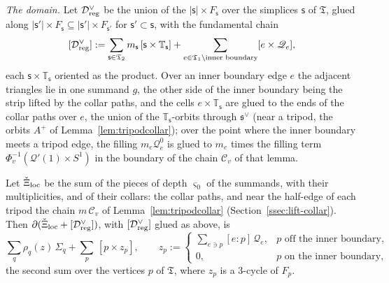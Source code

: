 \emph{The domain.} Let $\mathcal D^\vee_{\rm reg}$ be the union of the $|\mathsf s|\times F_{\mathsf s}$ over the simplices $\mathsf s$ of $\mathfrak T$,
glued along $|\mathsf s'|\times F_{\mathsf s}\subseteq|\mathsf s'|\times F_{\mathsf s'}$ for $\mathsf s'\subset \mathsf s$, with the fundamental chain
\[
[\mathcal D^\vee_{\rm reg}]:=\sum_{\mathsf s\in\mathfrak T_2}m_{\mathsf s}\,[\mathsf s\times\mathbb T_{\mathsf s}]+\sum_{e\in\mathfrak T_1\setminus\text{inner boundary}}[e\times \mathscr Q_e],
\]
each $\mathsf s\times\mathbb T_{\mathsf s}$ oriented as the product. Over an inner boundary edge $e$ the adjacent triangles lie in one summand
$g$, the other side of the inner boundary being the strip lifted by the collar paths, and the cells $e\times\mathbb T_{\mathsf s}$ are glued
to the ends of the collar paths over $e$, the union of the $\mathbb T_{\mathsf s}$-orbits through $\mathfrak s^\vee$ (near a
tripod, the orbits $A^+$ of Lemma~\ref{lem:tripodcollar}); over the point where the inner boundary meets a tripod edge, the
filling $m_e\mathscr Q_e^0$ is glued to $m_e$ times the filling term $\Phi_v^{-1}(\mathcal Q'(1)\times S^1)$ in the boundary
of the chain $\mathscr C_v$ of that lemma.

\begin{lemma}\label{lem:Mbd}
Let $\check\Xi_{\rm loc}$ be the sum of the pieces of depth $\varsigma_0$ of the summands, with their multiplicities,
and of their collars: the collar paths, and near the half-edge of each tripod the chain $m\,\mathscr C_v$ of
Lemma~\ref{lem:tripodcollar} (Section~\ref{ssec:lift-collar}). Then
$\partial(\check\Xi_{\rm loc}+[\mathcal D^\vee_{\rm reg}])$, with $[\mathcal D^\vee_{\rm reg}]$ glued as above, is
\[
\sum_q\rho_q(z)\,\Sigma_q+\sum_p\,[p\times z_p],\qquad
z_p:=\begin{cases}
\displaystyle\sum_{e\ni p}[e:p]\,\mathscr Q_e,&p\text{ off the inner boundary},\\
0,&p\text{ on the inner boundary},
\end{cases}
\]
the second sum over the vertices $p$ of $\mathfrak T$, where $z_p$ is a $3$-cycle of $F_p$.
\end{lemma}


